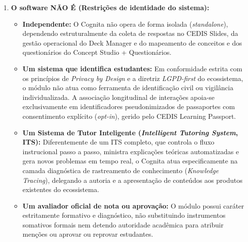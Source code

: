 \begin{enumerate}
    \item \textbf{O software NÃO É (Restrições de identidade do sistema):}
    \begin{itemize}
        \item \textbf{Independente:} O Cognita não opera de forma isolada (\textit{standalone}), dependendo estruturalmente da coleta de respostas no CEDIS Slides, da gestão operacional do Deck Manager e do mapeamento de conceitos e dos questionários do Concept Studio + Questionários.
        \item \textbf{Um sistema que identifica estudantes:} Em conformidade estrita com os princípios de \textit{Privacy by Design} \cite{cavoukian_privacy_2009} e a diretriz \textit{LGPD-first} do ecossistema, o módulo não atua como ferramenta de identificação civil ou vigilância individualizada. A associação longitudinal de interações apoia-se exclusivamente em identificadores pseudonimizados de passaportes com consentimento explícito (\textit{opt-in}), gerido pelo CEDIS Learning Passport.
        \item \textbf{Um Sistema de Tutor Inteligente (\textit{Intelligent Tutoring System}, ITS):} Diferentemente de um ITS completo, que controla o fluxo instrucional passo a passo, ministra explicações teóricas automatizadas e gera novos problemas em tempo real, o Cognita atua especificamente na camada diagnóstica de rastreamento de conhecimento (\textit{Knowledge Tracing}), delegando a autoria e a apresentação de conteúdos aos produtos existentes do ecossistema.
        \item \textbf{Um avaliador oficial de nota ou aprovação:} O módulo possui caráter estritamente formativo e diagnóstico, não substituindo instrumentos somativos formais nem detendo autoridade acadêmica para atribuir menções ou aprovar ou reprovar estudantes.
    \end{itemize}


\end{enumerate}
